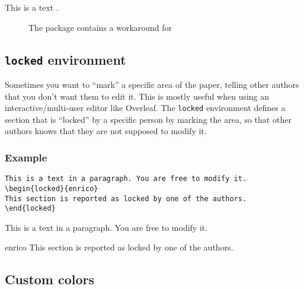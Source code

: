 \documentclass[a4paper]{article}
\begin{document}

This is a text .




\begin{figure}
\centering
\caption{The package contains a workaround for }
\end{figure}



\subsection{\texttt{locked} environment}

Sometimes you want to ``mark'' a specific area of the paper, telling other authors that you don't want them to edit it. This is mostly useful when using an interactive/multi-user editor like Overleaf. The \texttt{locked} environment defines a section that is ``locked'' by a specific person by marking the area, so that other authors knows that they are not supposed to modify it.

\subsubsection{Example}

\begin{verbatim}
This is a text in a paragraph. You are free to modify it.
\begin{locked}{enrico}
This section is reported as locked by one of the authors.
\end{locked}
\end{verbatim}

This is a text in a paragraph. You are free to modify it.
\begin{locked}{enrico}
This section is reported as locked by one of the authors.
\end{locked}


\subsection{Custom colors}
\end{document}
